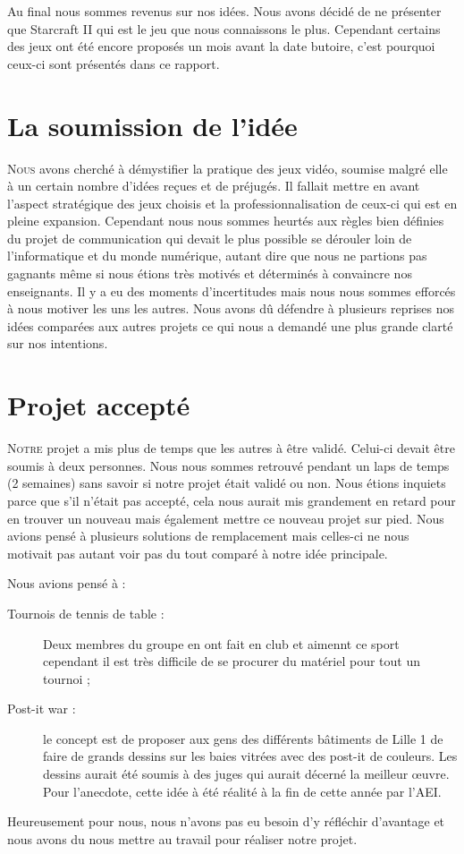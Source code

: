 Au final nous sommes revenus sur nos idées. Nous avons décidé
de ne présenter que Starcraft II qui est le jeu que nous connaissons le
plus. Cependant certains des jeux ont été encore proposés un mois avant
la date butoire, c'est pourquoi ceux-ci sont présentés dans ce rapport.

\section{La soumission de l'idée}%
\label{sec:la_soumission_de_l_idee}

\lettrine{N}{ous} avons cherché à démystifier la pratique des jeux vidéo, 
soumise malgré elle à un certain nombre d'idées reçues et de
préjugés. Il fallait mettre en avant l'aspect stratégique des jeux
choisis et la professionnalisation de ceux-ci qui est en pleine expansion. 
Cependant nous nous sommes heurtés aux règles bien définies du projet de
communication qui devait le plus possible se dérouler loin de
l'informatique et du monde numérique, autant dire que nous ne partions
pas gagnants même si nous étions très motivés et déterminés à convaincre
nos enseignants. Il y a eu des moments d'incertitudes mais nous nous
sommes efforcés à nous motiver les uns les autres. Nous avons dû
défendre à plusieurs reprises nos idées comparées aux autres projets ce
qui nous a demandé une plus grande clarté sur nos intentions.

\section{Projet accepté}%
\label{sec:projet_accepte}

\lettrine{N}{otre} projet a mis plus de temps que les autres à être
validé. Celui-ci devait être soumis à deux personnes. Nous nous sommes
retrouvé pendant un laps de temps (2 semaines) sans savoir si notre
projet était validé ou non. Nous étions inquiets parce que s'il n'était
pas accepté, cela nous aurait mis grandement en retard pour 
en trouver un nouveau mais également mettre ce nouveau projet sur pied. Nous
avions pensé à plusieurs solutions de remplacement mais celles-ci ne nous
motivait pas autant voir pas du tout comparé à notre idée principale.

Nous avions pensé à :

\begin{description}

\item[Tournois de tennis de table :] Deux membres du groupe en ont fait en
club et aimennt ce sport cependant il est très difficile de se procurer du
matériel pour tout un tournoi ;

\item[Post-it war :] le concept est de proposer aux gens des différents
bâtiments de Lille 1 de faire de grands dessins sur les baies vitrées
avec des post-it de couleurs. Les dessins aurait été soumis à des juges
qui aurait décerné la meilleur \oe{}uvre.  Pour l'anecdote, cette idée à
été réalité à la fin de cette année par l'AEI.

\end{description}

Heureusement pour nous, nous n'avons pas eu besoin d'y réfléchir
d'avantage et nous avons du nous mettre au travail pour réaliser notre
projet.

